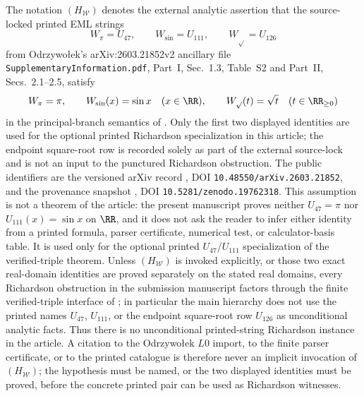 \begin{assumption}
\label{ass:HW}
The notation \((H_{\mathcal W})\) denotes the external analytic assertion that
the source-locked printed EML strings
\[
  W_{\pi}=U_{47},\qquad W_{\sin}=U_{111},
  \qquad W_{\sqrt{}}=U_{126}
\]
from Odrzywo{\l}ek's arXiv:2603.21852v2 ancillary file
\texttt{SupplementaryInformation.pdf}, Part~I, Sec.~1.3, Table~S2 and Part~II,
Secs.~2.1--2.5, satisfy
\[
  W_{\pi}=\pi,
  \qquad W_{\sin}(x)=\sin x\quad(x\in\RR),
  \qquad W_{\sqrt{}}(t)=\sqrt t\quad(t\in\RR_{\ge0})
\]
in the principal-branch semantics of .  Only the first two displayed
identities are used for the optional printed Richardson specialization in this
article; the endpoint square-root row is recorded solely as part of the external
source-lock and is not an input to the punctured Richardson obstruction.  The
public identifiers are
the versioned arXiv record \cite{Odrzywolek2026SingleBinaryOperator}, DOI
\texttt{10.48550/arXiv.2603.21852}, and the provenance snapshot
\cite{Odrzywolek2026ZenodoCode}, DOI \texttt{10.5281/zenodo.19762318}.  This
assumption is not a theorem of the article: the present manuscript proves neither
\(U_{47}=\pi\) nor \(U_{111}(x)=\sin x\) on \(\RR\), and it does not ask the reader to
infer either identity from a printed formula, parser certificate, numerical test,
or calculator-basis table.  It is used only for the optional printed
\(U_{47}\)/\(U_{111}\) specialization of the verified-triple theorem.  Unless
\((H_{\mathcal W})\) is invoked explicitly, or those two exact real-domain
identities are proved separately on the stated real domains, every Richardson
obstruction in the submission manuscript factors through the finite
verified-triple interface of ; in particular the main
hierarchy does not use the printed
names \(U_{47}\), \(U_{111}\), or the endpoint square-root row \(U_{126}\) as
unconditional analytic facts.  Thus there is no unconditional printed-string
Richardson instance in the article.  A citation to the Odrzywo{\l}ek \(L0\) import,
to the finite parser certificate, or to the printed catalogue is therefore never
an implicit invocation of \((H_{\mathcal W})\); the hypothesis must be named, or
the two displayed identities must be proved, before the concrete printed pair can
be used as Richardson witnesses.
\end{assumption}

